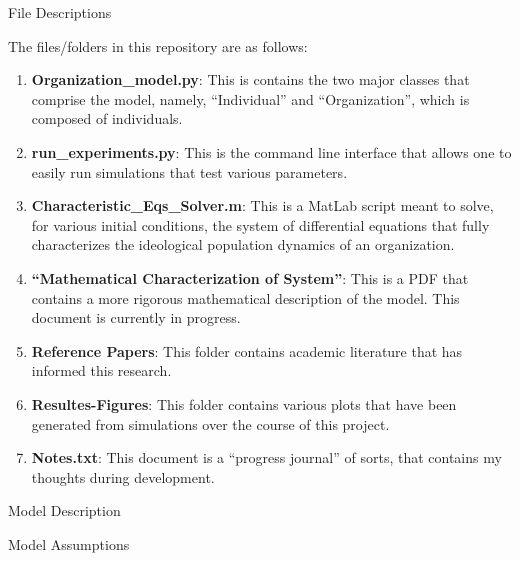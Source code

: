 \documentclass[]{article}
\providecommand{\tightlist}{%
  \setlength{\itemsep}{0pt}\setlength{\parskip}{0pt}}
\begin{document}
File Descriptions

The files/folders in this repository are as follows:

\begin{enumerate}
\def\labelenumi{\arabic{enumi}.}
\tightlist
\item
  \textbf{Organization\_model.py}: This is contains the two major
  classes that comprise the model, namely, ``Individual'' and
  ``Organization'', which is composed of individuals.
\item
  \textbf{run\_experiments.py}: This is the command line interface that
  allows one to easily run simulations that test various parameters.
\item
  \textbf{Characteristic\_Eqs\_Solver.m}: This is a MatLab script meant
  to solve, for various initial conditions, the system of differential
  equations that fully characterizes the ideological population dynamics
  of an organization.
\item
  \textbf{``Mathematical Characterization of System''}: This is a PDF
  that contains a more rigorous mathematical description of the model.
  This document is currently in progress.
\item
  \textbf{Reference Papers}: This folder contains academic literature
  that has informed this research.
\item
  \textbf{Resultes-Figures}: This folder contains various plots that
  have been generated from simulations over the course of this project.
\item
  \textbf{Notes.txt}: This document is a ``progress journal'' of sorts,
  that contains my thoughts during development.
\end{enumerate}

Model Description

Model Assumptions
\end{document}
